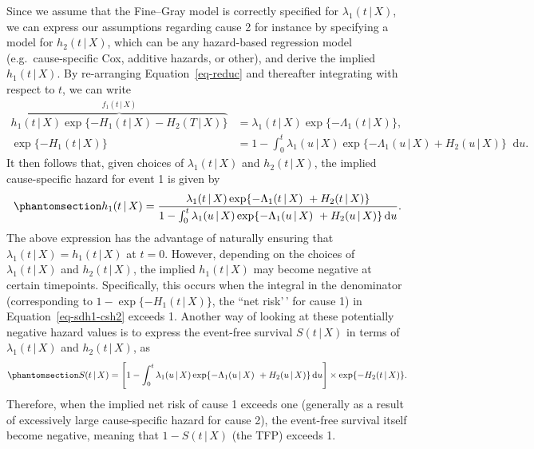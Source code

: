 \documentclass[
  letterpaper,
  DIV=11,
  numbers=noendperiod]{scrreprt}
\newcommand{\given}{\,|\,}
\newcommand\diff{\mathop{}\!\mathrm{d}}
\begin{document}
Since we assume that the Fine--Gray model is correctly specified for
\(\lambda_1(t \given X)\), we can express our assumptions regarding
cause 2 for instance by specifying a model for \(h_2(t \given X)\),
which can be any hazard-based regression model (e.g.~cause-specific Cox,
additive hazards, or other), and derive the implied \(h_1(t \given X)\).
By re-arranging Equation~\ref{eq-reduc} and thereafter integrating with
respect to \(t\), we can write
\begin{align*} %
    \overbrace{h_1(t \given X)\exp\{-H_1(t \given X)- H_2(T \given X)\}}^{f_1(t \given X)} &= \lambda_1(t \given X)\exp\{-\Lambda_1(t \given X)\}, \\
    \exp\{-H_1(t \given X)\} &= 1 -\int_{0}^{t} \lambda_1(u \given X)\exp\{-\Lambda_1(u \given X) + H_2(u \given X)\}\diff u.
\end{align*} It then follows that, given choices of
\(\lambda_1(t \given X)\) and \(h_2(t \given X)\), the implied
cause-specific hazard for event 1 is given by
\begin{equation}\phantomsection\label{eq-sdh1-csh2}{
h_1(t \given X) = \frac{\lambda_1(t \given X)\exp\{-\Lambda_1(t \given X)\ + H_2(t \given X)\}}{1 -\int_{0}^{t} \lambda_1(u \given X)\exp\{-\Lambda_1(u \given X)\ + H_2(u \given X)\}\diff u}.
}\end{equation} The above expression has the advantage of naturally
ensuring that \(\lambda_1(t \given X) = h_1(t \given X)\) at \(t = 0\).
However, depending on the choices of \(\lambda_1(t \given X)\) and
\(h_2(t \given X)\), the implied \(h_1(t \given X)\) may become negative
at certain timepoints. Specifically, this occurs when the integral in
the denominator (corresponding to \(1 - \exp\{-H_1(t \given X)\}\), the
``net risk'\,' for cause 1) in Equation~\ref{eq-sdh1-csh2} exceeds 1.
Another way of looking at these potentially negative hazard values is to
express the event-free survival \(S(t \given X)\) in terms of
\(\lambda_1(t \given X)\) and \(h_2(t \given X)\), as
\begin{equation}\phantomsection\label{eq-efs-reduc}{
S(t \given X) = \Bigg[1 -\int_{0}^{t} \lambda_1(u \given X)\exp\{-\Lambda_1(u \given X)\ + H_2(u \given X)\}\diff u\Bigg] \times \exp \{-H_2(t \given X)\}.
}\end{equation} Therefore, when the implied net risk of cause 1 exceeds
one (generally as a result of excessively large cause-specific hazard
for cause 2), the event-free survival itself become negative, meaning
that \(1 - S(t \given X)\) (the TFP) exceeds 1.
\end{document}
